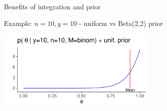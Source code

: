 \documentclass[english,t]{beamer}
\begin{document}


\begin{frame}{Benefits of integration and prior}

  \vspace{-0.5\baselineskip}
  Example: $n=10, y=10$ - uniform vs Beta(2,2) prior
  \begin{center}
    \includegraphics[width=7.8cm]{dbbeta10a.pdf}\\
  \end{center}

\end{frame}
\end{document}
